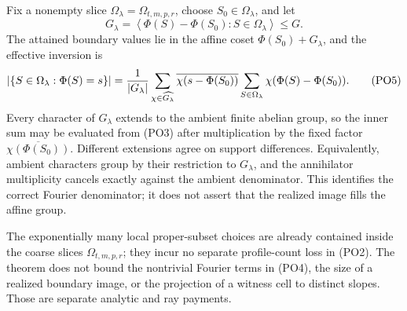 \documentclass[11pt,a4paper]{amsart}
\numberwithin{equation}{section}
\theoremstyle{remark}
\begin{document}
\begin{remark}
Fix a nonempty slice \(\Omega_\lambda=\Omega_{t,m,p,r}\), choose
\(S_0\in\Omega_\lambda\), and let
\[
 G_\lambda=
 \left\langle\Phi(S)-\Phi(S_0):S\in\Omega_\lambda\right\rangle
 \le G.
\]
The attained boundary values lie in the affine coset
\(\Phi(S_0)+G_\lambda\), and the effective inversion is
\[
 \lvert \{S\in\Omega_\lambda:\Phi(S)=s\}\rvert
 =\frac1{\lvert G_\lambda\rvert}
   \sum_{\chi\in\widehat{G_\lambda}}
   \overline{\chi(s-\Phi(S_0))}
   \sum_{S\in\Omega_\lambda}
      \chi(\Phi(S)-\Phi(S_0)).                       \tag{PO5}
\]
Every character of \(G_\lambda\) extends to the ambient finite abelian
group, so the inner sum may be evaluated from \textup{(PO3)} after
multiplication by the fixed factor
\(\overline{\chi(\Phi(S_0))}\).  Different extensions agree on support
differences.  Equivalently, ambient characters group by their restriction
to \(G_\lambda\), and the annihilator multiplicity cancels exactly against
the ambient denominator.  This identifies the correct Fourier denominator;
it does not assert that the realized image fills the affine group.
\end{remark}

\begin{remark}
The exponentially many local proper-subset choices are already contained
inside the coarse slices \(\Omega_{t,m,p,r}\); they incur no separate
profile-count loss in \textup{(PO2)}.  The theorem does not bound the
nontrivial Fourier terms in \textup{(PO4)}, the size of a realized
boundary image, or the projection of a witness cell to distinct slopes.
Those are separate analytic and ray payments.
\end{remark}
\end{document}
